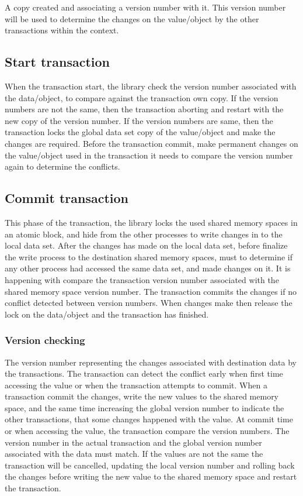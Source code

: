 \documentclass[12pt]{article}
\begin{document}
A copy created and associating a version number with it. This version number will be used to determine the changes on the value/object by the other transactions within the context.

\subsection{Start transaction}
When the transaction start, the library check the version number associated with the data/object, to compare against the transaction own copy. If the version numbers are not the same, then the transaction aborting and restart with the new copy of the version number. If the version numbers are same, then the transaction locks the global data set copy of the value/object and make the changes are required. Before the transaction commit, make permanent changes on the value/object used in the transaction it needs to compare the version number again to determine the conflicts.   

\subsection{Commit transaction}
This phase of the transaction, the library locks the used shared memory spaces in an atomic block, and hide from the other processes to write changes in to the local data set. After the changes has made on the local data set, before finalize the write process to the destination shared memory spaces, must to determine if any other process had accessed the same data set, and made changes on it. It is happening with compare the transaction version number associated with the shared memory space version number. The transaction commits the changes if no conflict detected between version numbers. When changes make then release the lock on the data/object and the transaction has finished.\\ 

\subsubsection{Version checking}
The version number representing the changes associated with destination data by the transactions. The transaction can detect the conflict early when first time accessing the value or when the transaction attempts to commit. When a transaction commit the changes, write the new values to the shared memory space, and the same time increasing the global version number to indicate the other transactions, that some changes happened with the value. At commit time or when accessing the value, the transaction compare the version numbers. The version number in the actual transaction and the global version number associated with the data must match. If the values are not the same the transaction will be cancelled, updating the local version number and rolling back the changes before writing the new value to the shared memory space and restart the transaction.
\end{document}
